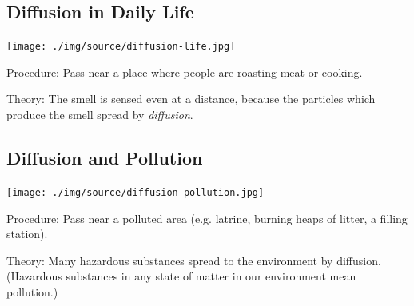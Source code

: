 \begin{multicols}{2}
\subsection{Diffusion in Daily Life}

\begin{center}
\texttt{[image: ./img/source/diffusion-life.jpg]}
\end{center}

\begin{description*}
\item[Procedure:]{Pass near a place where people are roasting meat or cooking.}
\item[Theory:]{The smell is sensed even at a distance, because the particles which produce the smell
spread by \emph{diffusion}.}
\end{description*}

\subsection{Diffusion and Pollution}

\begin{center}
\texttt{[image: ./img/source/diffusion-pollution.jpg]}
\end{center}

\begin{description*}
\item[Procedure:]{Pass near a polluted area (e.g. latrine, burning heaps of litter, a filling station).}
\item[Theory:]{Many hazardous substances spread to the environment by diffusion. (Hazardous
substances in any state of matter in our environment mean pollution.)}
\end{description*}


\end{multicols}
